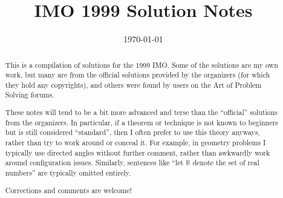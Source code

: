 \documentclass[11pt]{scrartcl}
\title{IMO 1999 Solution Notes}
\date{\today}
\begin{document}
\maketitle

\begin{abstract}
This is a compilation of solutions
for the 1999 IMO.
Some of the solutions are my own work,
but many are from the official solutions provided by the organizers
(for which they hold any copyrights),
and others were found by users on the Art of Problem Solving forums.

These notes will tend to be a bit more advanced and terse than the ``official''
solutions from the organizers.
In particular, if a theorem or technique is not known to beginners
but is still considered ``standard'', then I often prefer to
use this theory anyways, rather than try to work around or conceal it.
For example, in geometry problems I typically use directed angles
without further comment, rather than awkwardly work around configuration issues.
Similarly, sentences like ``let $\mathbb{R}$ denote the set of real numbers''
are typically omitted entirely.

Corrections and comments are welcome!
\end{abstract}

\tableofcontents
\newpage

\addtocounter{section}{-1}
\end{document}
